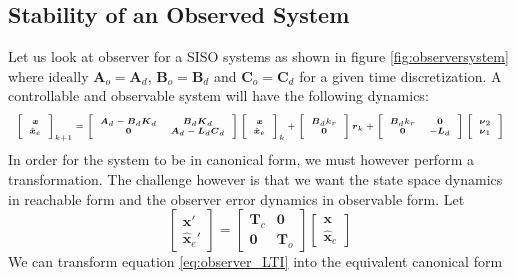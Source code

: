 \documentclass[twocolumn]{autart}    %
\newcommand{\mat}[1]{\boldsymbol{#1}}
\renewcommand{\vec}[1]{\boldsymbol{#1}}
\begin{document}
\subsection{Stability of an Observed System}\label{sec:cof_stability}
Let us look at observer for a SISO systems as shown in figure \ref{fig:observersystem} where ideally $\mat{A}_o=\mat{A}_d$, $\mat{B}_o=\mat{B}_d$ and $\mat{C}_o=\mat{C}_d$ for a given time discretization.
A controllable and observable system will have the following dynamics:
\begin{equation}
\tiny
\left [\begin{array}{c}\vec{x}\\ \hat{\vec{x}}_e \end{array}\right]_{k+1}
=\left [\begin{array}{cc}\mat{A}_d-\mat{B}_d\mat{K}_d&\mat{B}_d\mat{K}_d\\ \mat{0}&\mat{A}_d-\mat{L}_d\mat{C}_d\end{array}\right]
\left [\begin{array}{c}\vec{x}\\ \hat{\vec{x}}_e \end{array}\right]_k
+\left [\begin{array}{c}\mat{B}_dk_r\\ \mat{0} \end{array}\right] \vec{r}_k
+\left [\begin{array}{cc}\mat{B}_dk_r&\mat{0}\\ \mat{0}&-\mat{L}_d\end{array}\right]\left [\begin{array}{c}\vec{\nu}_2\\ \vec{\nu}_1\end{array}\right]
\end{equation}
In order for the system to be in canonical form, we must however perform a transformation. The challenge however is that we want the state space dynamics in
reachable form and the observer error dynamics in observable form. Let 
\begin{equation}
\left[\begin{array}{c}\vec{x}'\\ \hat{\vec{x}}_e'\end{array}\right]=
\left[\begin{array}{cc}\mat{T}_c & \mat{0}\\\mat{0} & \mat{T}_o\end{array}\right] 
\left[\begin{array}{c}\vec{x}\\ \hat{\vec{x}}_e\end{array}\right]
\end{equation}
We can transform equation \eqref{eq:observer_LTI} into the equivalent canonical form
\end{document}
